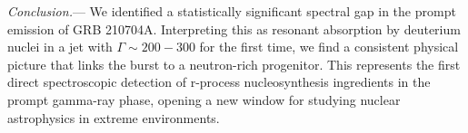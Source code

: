 \documentclass[linenumbers,twocolumn]{aastex631}
\begin{document}


\textit{Conclusion.}---
We identified a statistically significant spectral gap in the prompt emission of GRB 210704A. Interpreting this as resonant absorption by deuterium nuclei in a jet with $\Gamma \sim 200-300$ for the first time, we find a consistent physical picture that links the burst to a neutron-rich progenitor. This represents the first direct spectroscopic detection of r-process nucleosynthesis ingredients in the prompt gamma-ray phase, opening a new window for studying nuclear astrophysics in extreme environments.
\end{document}
